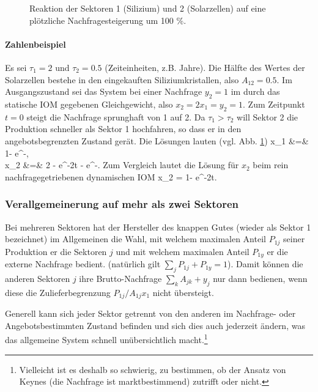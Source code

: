 \begin{figure}
\vspace{-7mm}

\caption{\label{fig:IOMdynSupply} Reaktion der Sektoren 1 (Silizium)
und 2 (Solarzellen) auf eine pl\"otzliche Nachfragesteigerung um 100 \%.
}
\end{figure}

\paragraph{Zahlenbeispiel}

Es sei $\tau_1=2$ und $\tau_2=0.5$ (Zeiteinheiten, z.B. Jahre). Die
H\"alfte des Wertes der Solarzellen 
bestehe in den eingekauften Siliziumkristallen, also  $A_{12}=0.5$. Im
Ausgangszustand sei das System bei einer Nachfrage $y_2=1$ im durch
das statische IOM gegebenen Gleichgewicht, also $x_2=2x_1=y_2=1$. Zum
Zeitpunkt $t=0$ steigt die Nachfrage sprunghaft von 1 auf 2.
Da $\tau_1>\tau_2$ will Sektor 2 die Produktion schneller als Sektor 1
hochfahren, so dass er in den angebotsbegrenzten Zustand
ger\"at. Die L\"osungen lauten (vgl. Abb. \ref{fig:IOMdynSupply})
\bdma
x_1 &=& 1- e^{-}, \\
x_2 &=& 2 - e^{-2t} -  e^{-}.
\edma
%
Zum Vergleich lautet die L\"osung f\"ur $x_2$ beim rein
nachfragegetriebenen dynamischen IOM
\bdm
x_2 = 1- e^{-2t}.
\edm


\subsubsection{Verallgemeinerung auf mehr als zwei Sektoren}

Bei mehreren Sektoren hat der Hersteller des knappen Gutes (wieder als
Sektor 1 bezeichnet) im
Allgemeinen die Wahl, mit welchem maximalen Anteil $P_{1j}$ seiner Produktion
er die Sektoren $j$ und mit welchem maximalen Anteil $P_{1y}$ er die
externe Nachfrage bedient. (nat\"urlich gilt $\sum_jP_{1j}+P_{1y}=1$).
Damit k\"onnen die anderen Sektoren $j$ ihre 
Brutto-Nachfrage $\sum_k A_{jk} + y_j$ nur dann bedienen, wenn diese
die Zulieferbegrenzung  $P_{1j}/A_{1j}x_1$ nicht \"ubersteigt. 

Generell kann sich jeder Sektor getrennt von den anderen im Nachfrage-
oder Angebotsbestimmten Zustand befinden und sich dies auch jederzeit
\"andern, was das allgemeine System schnell un\"ubersichtlich
 macht.\footnote{Vielleicht ist es deshalb so schwierig, zu bestimmen,
ob der Ansatz von Keynes (die Nachfrage
ist marktbestimmend) zutrifft oder nicht.}

